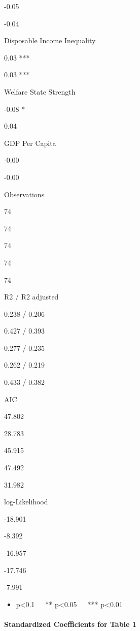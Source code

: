 \documentclass[
]{article}
\providecommand{\tightlist}{%
  \setlength{\itemsep}{0pt}\setlength{\parskip}{0pt}}
\begin{document}
-0.05

-0.04

Disposable Income Inequality

0.03 ***

0.03 ***

Welfare State Strength

-0.08 *

0.04

GDP Per Capita

-0.00

-0.00

Observations

74

74

74

74

74

R2 / R2 adjusted

0.238 / 0.206

0.427 / 0.393

0.277 / 0.235

0.262 / 0.219

0.433 / 0.382

AIC

47.802

28.783

45.915

47.492

31.982

log-Likelihood

-18.901

-8.392

-16.957

-17.746

-7.991

\begin{itemize}
\tightlist
\item
  p\textless0.1~~~** p\textless0.05~~~*** p\textless0.01
\end{itemize}

\hypertarget{standardized-coefficients-for-table-1}{%
\paragraph{Standardized Coefficients for Table
1}\label{standardized-coefficients-for-table-1}}
\end{document}
